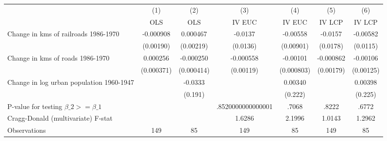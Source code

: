 {
\def\sym#1{\ifmmode^{#1}\else\(^{#1}\)\fi}
\begin{tabular}{l*{6}{c}}
\hline\hline
                &\multicolumn{1}{c}{(1)}&\multicolumn{1}{c}{(2)}&\multicolumn{1}{c}{(3)}&\multicolumn{1}{c}{(4)}&\multicolumn{1}{c}{(5)}&\multicolumn{1}{c}{(6)}\\
                &\multicolumn{1}{c}{OLS}&\multicolumn{1}{c}{OLS}&\multicolumn{1}{c}{IV EUC}&\multicolumn{1}{c}{IV EUC}&\multicolumn{1}{c}{IV LCP}&\multicolumn{1}{c}{IV LCP}\\
\hline
Change in kms of railroads 1986-1970&-0.000908         & 0.000467         &  -0.0137         & -0.00558         &  -0.0157         & -0.00582         \\
                &(0.00190)         &(0.00219)         & (0.0136)         &(0.00901)         & (0.0178)         & (0.0115)         \\
[1em]
Change in kms of roads 1986-1970& 0.000256         &-0.000250         &-0.000558         & -0.00101         &-0.000862         & -0.00106         \\
                &(0.000371)         &(0.000414)         &(0.00119)         &(0.000803)         &(0.00179)         &(0.00125)         \\
[1em]
Change in log urban population 1960-1947&                  &  -0.0333         &                  &  0.00340         &                  &  0.00398         \\
                &                  &  (0.191)         &                  &  (0.222)         &                  &  (0.225)         \\
\hline
P-value for testing $\beta\_{2} >= \beta\_{1}$&                  &                  &.8520000000000001         &    .7068         &    .8222         &    .6772         \\
Cragg-Donald (multivariate) F-stat&                  &                  &   1.6286         &   2.1996         &   1.0143         &   1.2962         \\
Observations    &      149         &       85         &      149         &       85         &      149         &       85         \\
\hline\hline
\end{tabular}
}
